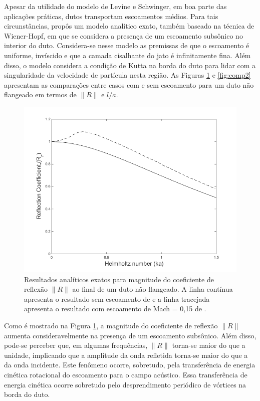 Apesar da utilidade do modelo de Levine e Schwinger, em boa parte das aplicações práticas, dutos transportam escoamentos médios. Para tais circunstâncias,  propôs um modelo analítico exato, também baseado na técnica de Wiener-Hopf, em que se considera a presença de um escoamento subsônico no interior do duto. Considera-se nesse modelo as premissas de que o escoamento é uniforme, invíscido e que a camada cisalhante do jato é infinitamente fina. Além disso, o modelo considera a condição de Kutta na borda do duto para lidar com a singularidade da velocidade de partícula nesta região. As Figuras \ref{fig:comp1} e \ref{fig:comp2} apresentam as comparações entre casos com e sem escoamento para um duto não flangeado em termos de $\|R\|$ e $l/a$.

\begin{figure}[ht!]
\centering
  \includegraphics[width=.9\linewidth]{figuras/abs_r_comparacao.png}
  \caption[Magnitudes do coeficiente de reflexão $|R|$]{Resultados analíticos exatos para magnitude do coeficiente de reflexão $\|R\|$ ao final de um duto não flangeado. A linha contínua apresenta o resultado sem escoamento de  e a linha tracejada apresenta o resultado com escoamento de Mach = 0,15 de .}
  \label{fig:comp1}
\end{figure}

Como é mostrado na Figura \ref{fig:comp1}, a magnitude do coeficiente de reflexão $\|R\|$ aumenta consideravelmente na presença de um escoamento subsônico. Além disso, pode-se perceber que, em algumas frequências, $\|R\|$ torna-se maior do que a unidade, implicando que a amplitude da onda refletida torna-se maior do que a da onda incidente. Este fenômeno ocorre, sobretudo, pela transferência de energia cinética rotacional do escoamento para o campo acústico. Essa transferência de energia cinética ocorre sobretudo pelo desprendimento periódico de vórtices na borda do duto.

